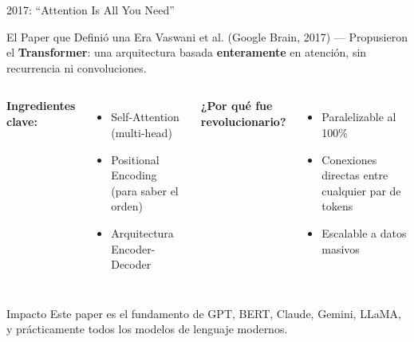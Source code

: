 \documentclass[aspectratio=169]{beamer}
\begin{document}
\begin{frame}{2017: ``Attention Is All You Need''}
    \begin{block}{El Paper que Definió una Era}
        Vaswani et al. (Google Brain, 2017) --- Propusieron el \textbf{Transformer}: una arquitectura basada \textbf{enteramente} en atención, sin recurrencia ni convoluciones.
    \end{block}
    
    \vspace{0.3cm}
    \begin{columns}
        \textbf{Ingredientes clave:}
        \begin{itemize}
            \item Self-Attention (multi-head)
            \item Positional Encoding (para saber el orden)
            \item Arquitectura Encoder-Decoder
        \end{itemize}
        
        \textbf{¿Por qué fue revolucionario?}
        \begin{itemize}
            \item[\faCheck] Paralelizable al 100\% 
            \item[\faCheck] Conexiones directas entre cualquier par de tokens
            \item[\faCheck] Escalable a datos masivos
        \end{itemize}
    \end{columns}
    
    \vspace{0.3cm}
    \begin{exampleblock}{Impacto}
        Este paper es el fundamento de GPT, BERT, Claude, Gemini, LLaMA, y prácticamente todos los modelos de lenguaje modernos.
    \end{exampleblock}
\end{frame}
\end{document}
